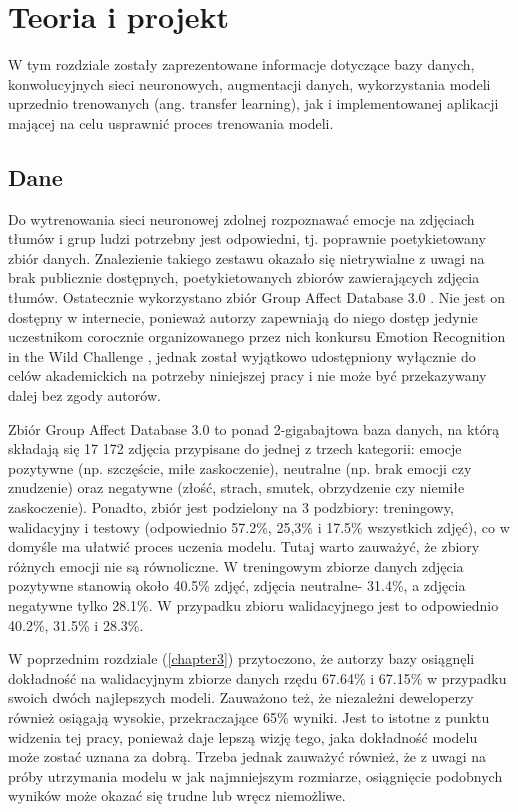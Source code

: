 \chapter{Teoria i projekt}
\thispagestyle{chapterBeginStyle}
\label{chapter4}


W tym rozdziale zostały zaprezentowane informacje dotyczące bazy danych, konwolucyjnych sieci neuronowych, augmentacji danych, wykorzystania modeli uprzednio trenowanych (ang. transfer learning), jak i implementowanej aplikacji mającej na celu usprawnić proces trenowania modeli.


\section{Dane}
Do wytrenowania sieci neuronowej zdolnej rozpoznawać emocje na zdjęciach tłumów i grup ludzi potrzebny jest odpowiedni, tj. poprawnie poetykietowany zbiór danych. Znalezienie takiego zestawu okazało się nietrywialne z uwagi na brak publicznie dostępnych, poetykietowanych zbiorów zawierających zdjęcia tłumów. Ostatecznie wykorzystano zbiór Group Affect Database 3.0 \cite{GAD}. Nie jest on dostępny w internecie, ponieważ autorzy zapewniają do niego dostęp jedynie uczestnikom corocznie organizowanego przez nich konkursu Emotion Recognition in the Wild Challenge \cite{EmotiwPage}\cite{EmotiwSummary}, jednak został wyjątkowo udostępniony wyłącznie do celów akademickich na potrzeby niniejszej pracy i nie może być przekazywany dalej bez zgody autorów. 

Zbiór Group Affect Database 3.0 to ponad 2-gigabajtowa baza danych, na którą składają się 17 172 zdjęcia przypisane do jednej z trzech kategorii: emocje pozytywne (np. szczęście, miłe zaskoczenie), neutralne (np. brak emocji czy znudzenie) oraz negatywne (złość, strach, smutek, obrzydzenie czy niemiłe zaskoczenie). Ponadto, zbiór jest podzielony na 3 podzbiory: treningowy, walidacyjny i testowy (odpowiednio 57.2\%, 25,3\% i 17.5\% wszystkich zdjęć), co w domyśle ma ułatwić proces uczenia modelu. Tutaj warto zauważyć, że zbiory różnych emocji nie są równoliczne. W treningowym zbiorze danych zdjęcia pozytywne stanowią około 40.5\% zdjęć, zdjęcia neutralne- 31.4\%, a zdjęcia negatywne tylko 28.1\%. W przypadku zbioru walidacyjnego jest to odpowiednio 40.2\%, 31.5\% i 28.3\%.

W poprzednim rozdziale (\ref{chapter3}) przytoczono, że autorzy bazy osiągnęli dokładność na walidacyjnym zbiorze danych rzędu 67.64\% i 67.15\% w przypadku swoich dwóch najlepszych modeli. Zauważono też, że niezależni deweloperzy również osiągają wysokie, przekraczające 65\% wyniki. Jest to istotne z punktu widzenia tej pracy, ponieważ daje lepszą wizję tego, jaka dokładność modelu może zostać uznana za dobrą. Trzeba jednak zauważyć również, że z uwagi na próby utrzymania modelu w jak najmniejszym rozmiarze, osiągnięcie podobnych wyników może okazać się trudne lub wręcz niemożliwe.


